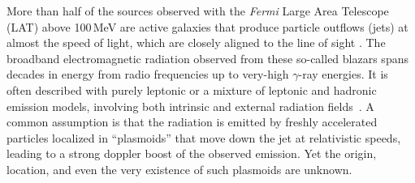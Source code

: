 \documentclass[twocolumn,linenumbers]{aastex62}
\newcommand{\gray}{$\gamma$-ray\xspace}
\newcommand{\Fermi}{\emph{Fermi}\xspace}
\newcommand{\FermiLAT}{\emph{Fermi}~LAT\xspace}
\begin{document}
More than half of the sources observed with the \Fermi Large Area Telescope (LAT) above 100\,MeV are active galaxies that produce particle outflows (jets) at almost the speed of light, which are closely aligned to the line of sight \citep[see, e.g., the third \FermiLAT source catalog, i.e., the 3FGL,][]{3fgl}.
The broadband electromagnetic radiation observed from these so-called blazars spans decades in energy from radio frequencies up to very-high \gray energies. 
It is often described with purely leptonic or a mixture of leptonic and hadronic emission models, involving both intrinsic and external radiation fields~\cite[e.g.,][and references therein]{Madejski:2016oqg}.
A common assumption is that the radiation is emitted by freshly accelerated   particles localized in ``plasmoids''  that move down the jet at relativistic speeds,
 leading to a strong doppler boost of the observed emission. 
Yet the origin, location, and even the very existence of such plasmoids are unknown.
\end{document}
